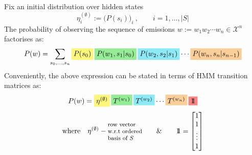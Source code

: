 \documentclass[aspectratio=169,11pt]{beamer}
\newcommand{\py}[1]{\colorbox{hly}{\ensuremath{#1}}}
\newcommand{\pg}[1]{\colorbox{hlg}{\ensuremath{#1}}}
\newcommand{\pc}[1]{\colorbox{hlc}{\ensuremath{#1}}}
\newcommand{\po}[1]{\colorbox{hlo}{\ensuremath{#1}}}
\newcommand{\pr}[1]{\colorbox{hlr}{\ensuremath{#1}}}
\newcommand{\ones}{\ensuremath{\mathrm{1}\mkern-6mu\mathrm{1}}}
\begin{document}
\begin{frame}
  \vspace{0.5em}
  Fix an initial distribution over hidden states
  \[
    \eta^{(\emptyset)}_i := \big(P(s_i)\big)_i\ ,
    \qquad i = 1,\ldots,|S|
  \]
  The probability of observing the sequence of emissions
  $w := w_1 w_2 \cdots w_n \in \mathcal{X}^n$ factorises as:
  \[
    P(w) = \sum_{s_0,\ldots,s_n}
      \py{P(s_0)}\,
      \pg{P(w_1,s_1|s_0)}\,
      \pc{P(w_2,s_2|s_1)} \cdots
      \po{P(w_n,s_n|s_{n-1})}
  \]
  Conveniently, the above expression can be stated in terms of HMM
  transition matrices as:
  \[
    P(w) = \py{\eta^{(\emptyset)}}\,
           \pg{T^{(w_1)}}\,
           \pc{T^{(w_2)}} \cdots
           \po{T^{(w_n)}}\,
           \pr{\ones}
  \]
  \vspace{-0.6em}
  \[
    \text{where}\quad
    \eta^{(\emptyset)} -
    \text{\footnotesize\begin{tabular}{@{}l@{}}row vector\\ w.r.t ordered\\ basis of $S$\end{tabular}}
    \qquad\&\qquad
    \ones = \begin{bmatrix}1\\1\\\vdots\\1\end{bmatrix}
  \]
\end{frame}
\end{document}
